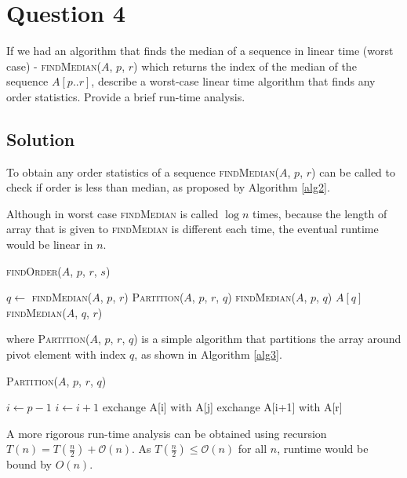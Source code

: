 
\section*{Question 4}

If we had an algorithm that finds the median of a sequence in linear time (worst case) - \textsc{findMedian($A$, $p$, $r$)} which returns the index of the median of the sequence $A[p..r]$, describe a worst-case linear time algorithm that finds any order statistics. Provide a brief run-time analysis.

\subsection*{Solution}

To obtain any order statistics of a sequence \textsc{findMedian($A$, $p$, $r$)} can be called to check if order is less than median, as proposed by Algorithm \ref{alg2}.

Although in worst case \textsc{findMedian} is called $\log n$ times, because the length of array that is given to \textsc{findMedian} is different each time, the eventual runtime would be linear in $n$.

\begin{algorithm}[H]
\caption{\textsc{findOrder($A$, $p$, $r$, $s$)}}\label{alg2}
\begin{algorithmic}[1]
\State $q \leftarrow $ \textsc{findMedian($A$, $p$, $r$)}
\State \textsc{Partition($A$, $p$, $r$, $q$)}
\State \Return \textsc{findMedian($A$, $p$, $q$)}
\State \Return $A[q]$
\Else
\State \Return \textsc{findMedian($A$, $q$, $r$)}
\EndIf
\end{algorithmic}
\end{algorithm}

where \textsc{Partition($A$, $p$, $r$, $q$)} is a simple algorithm that partitions the array around pivot element with index $q$, as shown in Algorithm \ref{alg3}.

\begin{algorithm}[H]
\caption{\textsc{Partition($A$, $p$, $r$, $q$)}}\label{alg3}
\begin{algorithmic}[1]
\State $i \leftarrow p - 1 $
\State $i \leftarrow i + 1$
\State exchange A[i] with A[j]
\EndIf
\State exchange A[i+1] with A[r]
\EndFor
\end{algorithmic}
\end{algorithm}

A more rigorous run-time analysis can be obtained using recursion $T(n) = T(\frac{n}{2}) + \mathcal{O}(n)$. As $T(\frac{n}{2}) \leq \mathcal{O}(n)$ for all $n$, runtime would be bound by $O(n)$.
